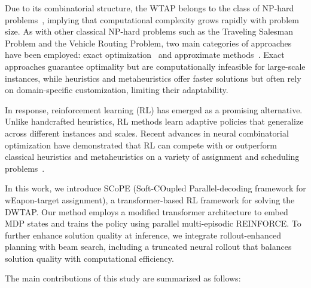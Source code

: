\documentclass[smallcondensed]{svjour3}
\begin{document}
Due to its combinatorial structure, the WTAP belongs to the class of NP-hard problems~\cite{lloyd1986weapons}, implying that computational complexity grows rapidly with problem size. As with other classical NP-hard problems such as the Traveling Salesman Problem and the Vehicle Routing Problem, two main categories of approaches have been employed: exact optimization~\cite{ahuja2007exact,johansson2011mixed,lee2019real} and approximate methods~\cite{lee2003genetic,karasakal2009efficient,li2021novel}. Exact approaches guarantee optimality but are computationally infeasible for large-scale instances, while heuristics and metaheuristics offer faster solutions but often rely on domain-specific customization, limiting their adaptability.

In response, reinforcement learning (RL) has emerged as a promising alternative. Unlike handcrafted heuristics, RL methods learn adaptive policies that generalize across different instances and scales. Recent advances in neural combinatorial optimization have demonstrated that RL can compete with or outperform classical heuristics and metaheuristics on a variety of assignment and scheduling problems~\cite{lee2024attention,kool2018attention,kwon2020pomo}.

In this work, we introduce SCoPE (Soft-COupled Parallel-decoding framework for wEapon-target assignment), a transformer-based RL framework for solving the DWTAP. Our method employs a modified transformer architecture to embed MDP states and trains the policy using parallel multi-episodic REINFORCE. To further enhance solution quality at inference, we integrate rollout-enhanced planning with beam search, including a truncated neural rollout that balances solution quality with computational efficiency.

The main contributions of this study are summarized as follows:
\end{document}
